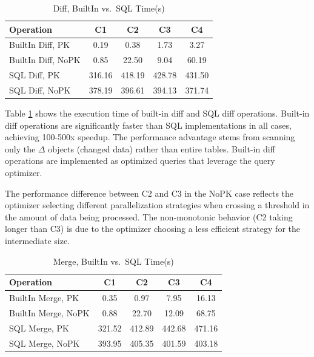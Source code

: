 \documentclass[sigconf,nonacm]{acmart} %
\begin{document}
\begin{table}[h]
  \centering
  \caption{Diff, BuiltIn vs.\ SQL Time(s)}
  \label{tab:expdiff}
  \begin{tabular}{lcccc}
    \toprule
    \textbf{Operation} & \textbf{C1} & \textbf{C2} & \textbf{C3} & \textbf{C4} \\
    \midrule
    BuiltIn Diff, PK  & 0.19 & 0.38 & 1.73 & 3.27 \\
    BuiltIn Diff, NoPK  & 0.85 & 22.50 & 9.04 & 60.19 \\
    SQL Diff, PK  & 316.16 & 418.19 & 428.78 & 431.50 \\
    SQL Diff, NoPK  & 378.19 & 396.61 & 394.13 & 371.74 \\
    \bottomrule
  \end{tabular}
\end{table}

Table \ref{tab:expdiff} shows the execution time of built-in diff and SQL diff operations.
Built-in diff operations are significantly faster than SQL implementations in all cases, 
achieving 100-500x speedup. The performance advantage stems from scanning only the 
$\Delta$ objects (changed data) rather than entire tables. Built-in diff operations 
are implemented as optimized queries that leverage the query optimizer. 

The performance difference between C2 and C3 in the NoPK case reflects the optimizer 
selecting different parallelization strategies when crossing a threshold in the 
amount of data being processed. The non-monotonic behavior (C2 taking longer than C3) 
is due to the optimizer choosing a less efficient strategy for the intermediate size.

\begin{table}[h]
  \centering
  \caption{Merge, BuiltIn vs.\ SQL Time(s)}
  \label{tab:expmerge}
  \begin{tabular}{lcccc}
    \toprule
    \textbf{Operation} & \textbf{C1} & \textbf{C2} & \textbf{C3} & \textbf{C4} \\
    \midrule
    BuiltIn Merge, PK  & 0.35 & 0.97 & 7.95 & 16.13 \\
    BuiltIn Merge, NoPK  & 0.88 & 22.70 & 12.09 & 68.75 \\
    SQL Merge, PK  & 321.52 & 412.89 & 442.68 & 471.16 \\
    SQL Merge, NoPK  & 393.95 & 405.35 & 401.59 & 403.18 \\
    \bottomrule
  \end{tabular}
\end{table}
\end{document}
